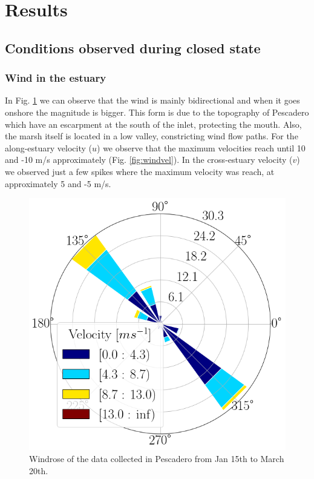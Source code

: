 \documentclass[tesis.tex]{subfiles}
\begin{document}
    
\section{Results}

\subsection{Conditions observed during closed state}

\subsubsection{Wind in the estuary}

In Fig. \ref{fig:windrose} we can observe that the wind is mainly bidirectional and when it goes onshore the magnitude is bigger. This form is due to the topography of Pescadero which have an escarpment at the south of the inlet, protecting the mouth. Also, the marsh itself is located in a low valley, constricting wind flow paths. For the along-estuary velocity ($u$) we observe that the maximum velocities reach until 10 and -10 m/s approximately (Fig. \ref{fig:windvel}). In the cross-estuary velocity ($v$) we observed just a few spikes where the maximum velocity was reach, at approximately 5 and -5 m/s.   

\begin{figure}[h!]
    \centering
    \includegraphics[scale=0.3]{Imagenes/windrose.png}
    \caption{Windrose of the data collected in Pescadero from Jan 15th to March 20th.}
    \label{fig:windrose}
\end{figure}
\end{document}

